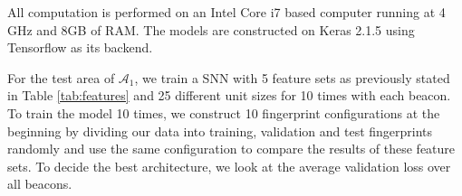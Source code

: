 \documentclass{article}
\begin{document}
	All computation is performed on an Intel Core i7 based computer running at 4 GHz and 8GB of RAM. The models are constructed on Keras 2.1.5 \cite{chollet2015} using Tensorflow as its backend. 
	
	For the test area of $\mathcal{A}_1$, we train a SNN with 5  feature sets as previously stated in Table \ref{tab:features} and 25 different unit sizes for 10 times with each beacon. To train the model 10 times, we construct 10 fingerprint configurations at the beginning by dividing our data into training, validation and test fingerprints randomly and use the same configuration to compare the results of these feature sets. To decide the best architecture, we look at the average validation loss over all beacons. 
	
\end{document}
